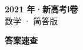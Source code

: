 \documentclass[zihao=-4, a4paper]{ctexart}
\begin{document}
\begin{center}
  {\Large\bfseries 2021 年·新高考Ⅰ卷}\\[4pt]
  {\large 数学 · 简答版}
\end{center}
\medskip
{}

\clearpage
{}
\begin{center}{\Large\bfseries 答案速查}\end{center}
\medskip

\end{document}
